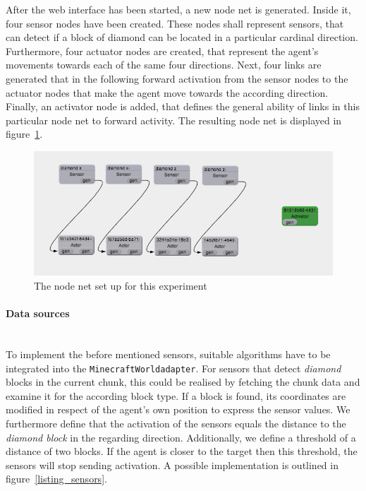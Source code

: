 After the web interface has been started, a new node net is generated. Inside it, four sensor nodes have been created. These nodes shall represent sensors, that can detect if a block of diamond can be located in a particular cardinal direction. Furthermore, four actuator nodes are created, that represent the agent's movements towards each of the same four directions. Next, four links are generated that in the following forward activation from the sensor nodes to the actuator nodes that make the agent move towards the according direction. Finally, an activator node is added, that defines the general ability of links in this particular node net to forward activity. The resulting node net is displayed in figure~\ref{nodenet_setup}.

\begin{figure}[h]
  \centering
    \includegraphics[width=14cm]{graphics/nodenet_setup}
  \caption{The node net set up for this experiment}
  \label{nodenet_setup}
\end{figure}

\paragraph{Data sources}$\;$ \\

To implement the before mentioned sensors, suitable algorithms have to be integrated into the \texttt{MinecraftWorldadapter}. For sensors that detect \emph{diamond} blocks in the current chunk, this could be realised by fetching the chunk data and examine it for the according block type. If a block is found, its coordinates are modified in respect of the agent's own position to express the sensor values. We furthermore define that the activation of the sensors equals the distance to the \emph{diamond block} in the regarding direction. Additionally, we define a threshold of a distance of two blocks. If the agent is closer to the target then this threshold, the sensors will stop sending activation. A possible implementation is outlined in figure~\ref{listing_sensors}. 

